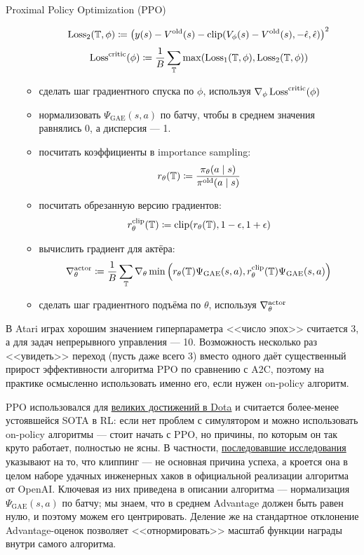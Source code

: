 \begin{algorithm}[label = PPOalgorithm]{Proximal Policy Optimization (PPO)}
\begin{enumerate}
\begin{itemize}
    $$\operatorname{Loss}_2(\mathbb{T}, \phi) \coloneqq \left( y(s) - V^{\mathrm{old}}(s) - \mathrm{clip}(V_\phi(s) - V^{\mathrm{old}}(s), -\hat{\epsilon}, \hat{\epsilon}) \right) ^2$$
    $$\operatorname{Loss}^{\mathrm{critic}}(\phi) \coloneqq \frac{1}{B}\sum_{\mathbb{T}} \max(\operatorname{Loss}_1(\mathbb{T}, \phi), \operatorname{Loss}_2(\mathbb{T}, \phi))$$
    \item сделать шаг градиентного спуска по $\phi$, используя $\nabla_\phi \operatorname{Loss}^{\mathrm{critic}}(\phi)$
    \item нормализовать $\Psi_{\mathrm{GAE}}(s, a)$ по батчу, чтобы в среднем значения равнялись 0, а дисперсия --- 1.
    \item посчитать коэффициенты в importance sampling:
    $$r_\theta(\mathbb{T}) \coloneqq \frac{\pi_\theta(a \mid s)}{\pi^{\mathrm{old}}(a \mid s)}$$
    \item посчитать обрезанную версию градиентов:
    $$r_\theta^{\mathrm{clip}}(\mathbb{T}) \coloneqq \mathrm{clip}(r_\theta(\mathbb{T}), 1 - \epsilon, 1 + \epsilon)$$
    \item вычислить градиент для актёра:
    $$\nabla^{\mathrm{actor}}_\theta \coloneqq \frac{1}{B}\sum_{\mathbb{T}} \nabla_\theta \min \left( r_\theta(\mathbb{T})\Psi_{\mathrm{GAE}}(s, a), r_\theta^{\mathrm{clip}}(\mathbb{T})\Psi_{\mathrm{GAE}}(s, a) \right) $$
    \item сделать шаг градиентного подъёма по $\theta$, используя $\nabla^{\mathrm{actor}}_\theta$
    \end{itemize}
\end{enumerate}
\end{algorithm}

\begin{remark}
В Atari играх хорошим значением гиперпараметра <<число эпох>> считается 3, а для задач непрерывного управления --- 10. Возможность несколько раз <<увидеть>> переход (пусть даже всего 3) вместо одного даёт существенный прирост эффективности алгоритма PPO по сравнению с A2C, поэтому на практике осмысленно использовать именно его, если нужен on-policy алгоритм.  
\end{remark}

\begin{remark}
PPO использовался для \href{https://openai.com/blog/openai-five/}{великих достижений в Dota} и считается более-менее устоявшейся SOTA в RL: если нет проблем с симулятором и можно использовать on-policy алгоритмы --- стоит начать с PPO, но причины, по которым он так круто работает, полностью не ясны. В частности, \href{https://openreview.net/forum?id=r1etN1rtPB}{последовавшие исследования} указывают на то, что клиппинг --- не основная причина успеха, а кроется она в целом наборе удачных инженерных хаков в официальной реализации алгоритма от OpenAI. Ключевая из них приведена в описании алгоритма --- нормализация $\Psi_{\mathrm{GAE}}(s, a)$ по батчу; мы знаем, что в среднем Advantage должен быть равен нулю, и поэтому можем его центрировать. Деление же на стандартное отклонение Advantage-оценок позволяет <<отнормировать>> масштаб функции награды внутри самого алгоритма.
\end{remark}

